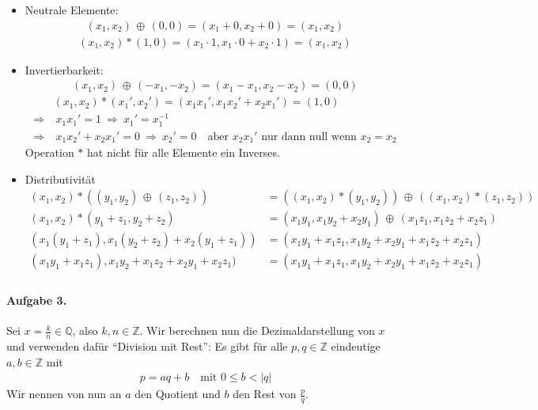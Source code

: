 \documentclass{article}
\newcommand{\xor}{\, \oplus\, }
\begin{document}
\begin{itemize}
    \item Neutrale Elemente:
    \begin{align*}
        (x_1, x_2) \xor (0, 0) = (x_1 + 0, x_2 + 0) = (x_1, x_2)
    \end{align*}
    \begin{align*}
        (x_1, x_2) * (1, 0) = (x_1 \cdot 1, x_1 \cdot 0 + x_2 \cdot 1) = (x_1, x_2)
    \end{align*}

    \item Invertierbarkeit:
    \begin{align*}
        (x_1, x_2) \xor (-x_1, -x_2) = (x_1 - x_1, x_2 - x_2) = (0, 0)
    \end{align*}
    \begin{align*}
        &(x_1, x_2) * (x_1', x_2') = (x_1x_1', x_1x_2' + x_2x_1') = (1, 0) \\
        \Rightarrow&\  x_1x_1' = 1\ \Rightarrow\ x_1' = x_1^{-1} \\
        \Rightarrow&\  x_1x_2' + x_2x_1' = 0\ \Rightarrow\ x_2' = 0 \quad \text{aber $x_2x_1'$ nur dann null wenn $x_2 = x_2$}
    \end{align*}
    Operation $*$ hat nicht für alle Elemente ein Inverses.

    \item Distributivität
    \begin{align*}
        (x_1, x_2) * ((y_1, y_2) \xor (z_1, z_2)) &= ((x_1, x_2) * (y_1, y_2)) \xor ((x_1, x_2) * (z_1, z_2)) \\
        (x_1, x_2) * (y_1 + z_1, y_2 + z_2) &= (x_1y_1, x_1y_2 + x_2y_1) \xor (x_1z_1, x_1z_2 + x_2z_1) \\
        (x_1(y_1 + z_1), x_1(y_2 + z_2) + x_2(y_1 + z_1)) &= (x_1y_1 + x_1z_1, x_1y_2 + x_2y_1 + x_1z_2 + x_2z_1) \\
        (x_1y_1 + x_1z_1), x_1y_2 + x_1z_2 + x_2y_1 + x_2z_1) &= (x_1y_1 + x_1z_1, x_1y_2 + x_2y_1 + x_1z_2 + x_2z_1) \\
    \end{align*}
\end{itemize}

\paragraph{Aufgabe 3.} Sei $x = \frac{k}{n} \in \mathbb{Q}$, also $k, n \in \mathbb{Z}$. Wir berechnen nun die Dezimaldarstellung von $x$ und verwenden dafür \enquote{Division mit Rest}: Es gibt für alle $p, q \in \mathbb{Z}$ eindeutige $a, b \in \mathbb{Z}$ mit
\begin{align*}
    p = aq + b \quad \text{mit $0 \leq b < |q|$}
\end{align*}
Wir nennen von nun an $a$ den Quotient und $b$ den Rest von $\frac{p}{q}$.
\end{document}
